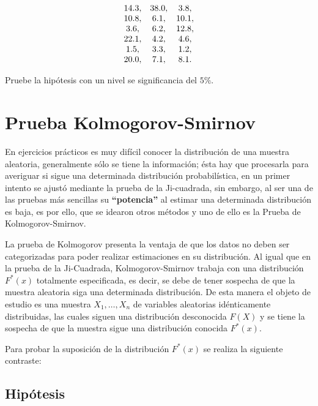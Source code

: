 \documentclass[
  a4paper,
  oneside,
  openany]{book}
\begin{document}
\[
\begin{array}{c c c}
14.3, & 38.0, & 3.8,  \\ 
10.8, & 6.1,& 10.1, \\ 
3.6, & 6.2, & 12.8, \\ 
22.1, & 4.2, & 4.6,  \\ 
1.5, & 3.3, & 1.2,  \\   
20.0, & 7.1,& 8.1.\\
\end{array}
\]

Pruebe la hipótesis con un nivel se significancia del \(5\%\).

\hypertarget{prueba-kolmogorov-smirnov}{%
\chapter{Prueba Kolmogorov-Smirnov}\label{prueba-kolmogorov-smirnov}}

En ejercicios prácticos es muy difícil conocer la distribución de una muestra aleatoria, generalmente
sólo se tiene la información; ésta hay que procesarla para averiguar si sigue una determinada distribución probabilística, en un primer intento se ajustó mediante la prueba de la Ji-cuadrada, sin embargo, al ser una de las pruebas más sencillas su \textbf{``potencia''} al estimar una determinada distribución es baja, es por ello, que se idearon otros métodos y uno de ello es la Prueba de Kolmogorov-Smirnov.

La prueba de Kolmogorov presenta la ventaja de que los datos no deben ser categorizadas para poder realizar estimaciones en su distribución. Al igual que en la prueba de la Ji-Cuadrada, Kolmogorov-Smirnov trabaja con una distribución \(F^*(x)\) totalmente especificada, es decir, se debe de tener sospecha de que la muestra aleatoria siga una determinada distribución. De esta manera el objeto de estudio es una muestra \(X_{1},\ldots,X_{n}\) de variables aleatorias idénticamente distribuidas, las cuales siguen una distribución desconocida \(F(X)\) y se tiene la sospecha de que la muestra sigue una distribución conocida \(F^*(x)\).

Para probar la suposición de la distribución \(F^*(x)\) se realiza la siguiente contraste:

\hypertarget{hipuxf3tesis-15}{%
\section{Hipótesis}\label{hipuxf3tesis-15}}
\end{document}
